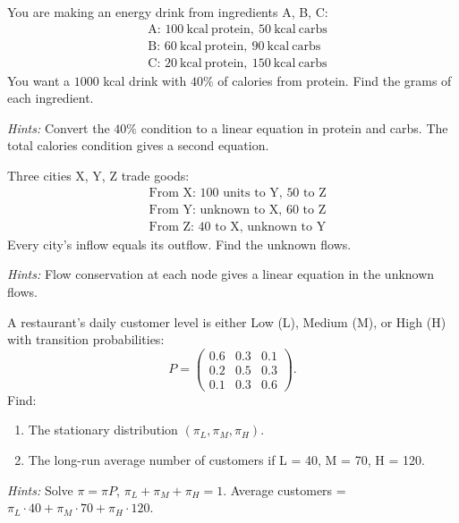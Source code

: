 \documentclass[11pt]{article}
\begin{document}
\begin{problem}
You are making an energy drink from ingredients A, B, C:
\[
\begin{aligned}
&\text{A: } 100\ \mathrm{kcal\ protein},\ 50\ \mathrm{kcal\ carbs} \\
&\text{B: } 60\ \mathrm{kcal\ protein},\ 90\ \mathrm{kcal\ carbs} \\
&\text{C: } 20\ \mathrm{kcal\ protein},\ 150\ \mathrm{kcal\ carbs}
\end{aligned}
\]
You want a $1000$ kcal drink with $40\%$ of calories from protein. Find the grams of each ingredient.

\textit{Hints:}  
Convert the $40\%$ condition to a linear equation in protein and carbs. The total calories condition gives a second equation.
\end{problem}

\begin{problem}
Three cities X, Y, Z trade goods:
\[
\begin{aligned}
&\text{From X: } 100 \text{ units to Y, } 50 \text{ to Z} \\
&\text{From Y: unknown to X, } 60 \text{ to Z} \\
&\text{From Z: } 40 \text{ to X, unknown to Y}
\end{aligned}
\]
Every city’s inflow equals its outflow. Find the unknown flows.

\textit{Hints:}  
Flow conservation at each node gives a linear equation in the unknown flows.
\end{problem}

\begin{problem}
A restaurant’s daily customer level is either Low (L), Medium (M), or High (H) with transition probabilities:
\[
P = \begin{pmatrix}
0.6 & 0.3 & 0.1 \\
0.2 & 0.5 & 0.3 \\
0.1 & 0.3 & 0.6
\end{pmatrix}.
\]
Find:
\begin{enumerate}
    \item The stationary distribution $(\pi_L,\pi_M,\pi_H)$.
    \item The long-run average number of customers if L = 40, M = 70, H = 120.
\end{enumerate}

\textit{Hints:}  
Solve $\pi = \pi P$, $\pi_L + \pi_M + \pi_H = 1$. Average customers = $\pi_L \cdot 40 + \pi_M \cdot 70 + \pi_H \cdot 120$.
\end{problem}
\end{document}
